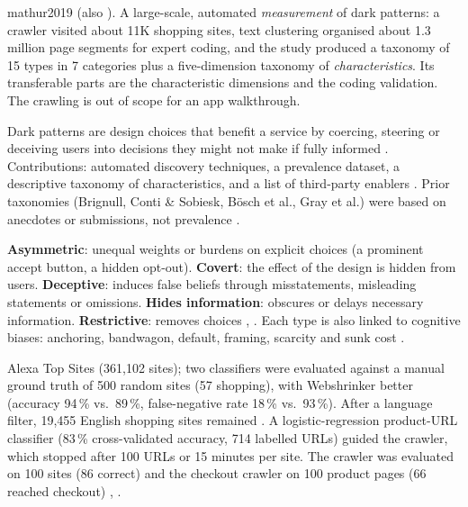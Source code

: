 \begin{papercard}{mathur2019}
   (also ). A large-scale, automated \emph{measurement} of dark patterns: a crawler visited about 11K shopping sites, text clustering organised about 1.3 million page segments for expert coding, and the study produced a taxonomy of 15 types in 7 categories plus a five-dimension taxonomy of \emph{characteristics}. Its transferable parts are the characteristic dimensions and the coding validation. The crawling is out of scope for an app walkthrough.

 Dark patterns are design choices that benefit a service by coercing, steering or deceiving users into decisions they might not make if fully informed . Contributions: automated discovery techniques, a prevalence dataset, a descriptive taxonomy of characteristics, and a list of third-party enablers . Prior taxonomies (Brignull, Conti \& Sobiesk, Bösch et al., Gray et al.) were based on anecdotes or submissions, not prevalence .

 \textbf{Asymmetric}: unequal weights or burdens on explicit choices (a prominent accept button, a hidden opt-out). \textbf{Covert}: the effect of the design is hidden from users. \textbf{Deceptive}: induces false beliefs through misstatements, misleading statements or omissions. \textbf{Hides information}: obscures or delays necessary information. \textbf{Restrictive}: removes choices , . Each type is also linked to cognitive biases: anchoring, bandwagon, default, framing, scarcity and sunk cost .

 Alexa Top Sites (361,102 sites); two classifiers were evaluated against a manual ground truth of 500 random sites (57 shopping), with Webshrinker better (accuracy 94\,\% vs.\ 89\,\%, false-negative rate 18\,\% vs.\ 93\,\%). After a language filter, 19,455 English shopping sites remained . A logistic-regression product-URL classifier (83\,\% cross-validated accuracy, 714 labelled URLs) guided the crawler, which stopped after 100 URLs or 15 minutes per site. The crawler was evaluated on 100 sites (86 correct) and the checkout crawler on 100 product pages (66 reached checkout) , .


\end{papercard}
